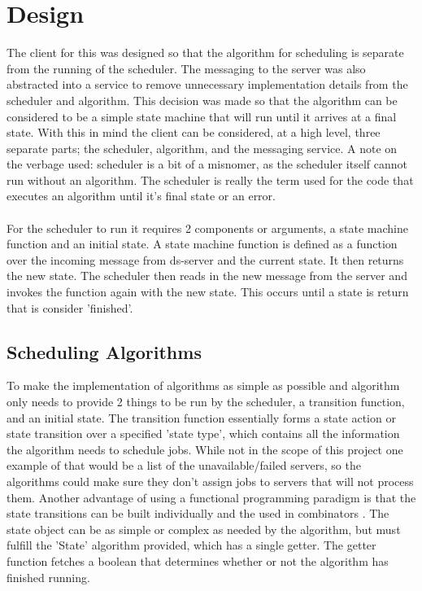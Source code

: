 \documentclass[a4paper]{article} %
\begin{document}
\section*{Design}
The client for this was designed so that the algorithm for scheduling is separate from the running of the scheduler. The messaging to the server was also abstracted into a service to remove unnecessary implementation details from the scheduler and algorithm.
This decision was made so that the algorithm can be considered to be a simple state machine that will run until it arrives at a final state. 
With this in mind the client can be considered, at a high level, three separate parts; the scheduler, algorithm, and the messaging service.
A note on the verbage used: scheduler is a bit of a misnomer, as the scheduler itself cannot run without an algorithm. The scheduler is really the term used for the code that executes an algorithm until it's final state or an error.
\\
\\
For the scheduler to run it requires 2 components or arguments, a state machine function and an initial state. 
A state machine function is defined as a function over the incoming message from ds-server and the current state.
It then returns the new state. The scheduler then reads in the new message from the server and invokes the function again with the new state.
This occurs until a state is return that is consider 'finished'. 
\subsection*{Scheduling Algorithms}
To make the implementation of algorithms as simple as possible and algorithm only needs to provide 2 things to be run by the scheduler, a transition function, and an initial state.
The transition function essentially forms a state action or state transition \cite{scala_fp} over a specified 'state type', which contains all the information the algorithm needs to schedule jobs.
While not in the scope of this project one example of that would be a list of the unavailable/failed servers, so the algorithms could make sure they don't assign jobs to servers that will not process them.
Another advantage of using a functional programming paradigm is that the state transitions can be built individually and the used in combinators \cite{scala_fp}.
The state object can be as simple or complex as needed by the algorithm, but must fulfill the 'State' algorithm provided, which has a single getter. The getter function fetches a boolean that determines whether or not the algorithm has finished running.
\end{document}
